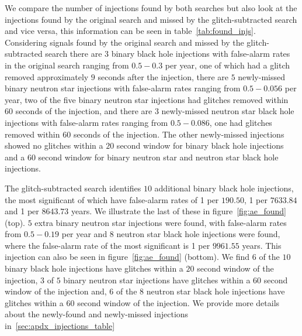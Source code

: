 We compare the number of injections found by both searches but also look at the \gw{} injections found by the original search and missed by the glitch-subtracted search and vice versa, this information can be seen in table~\ref{tab:found_injs}. Considering signals found by the original search and missed by the glitch-subtracted search there are $3$ binary black hole injections with false-alarm rates in the original search ranging from $0.5 - 0.3$ per year, one of which had a glitch removed approximately $9$ seconds after the injection, there are $5$ newly-missed binary neutron star injections with false-alarm rates ranging from $0.5 - 0.056$ per year, two of the five binary neutron star injections had glitches removed within $60$ seconds of the injection, and there are $3$ newly-missed neutron star black hole injections with false-alarm rates ranging from $0.5 - 0.086$, one had glitches removed within $60$ seconds of the injection. The other newly-missed injections showed no \scl{} glitches within a $20$ second window for binary black hole injections and a $60$ second window for binary neutron star and neutron star black hole injections.

The glitch-subtracted search identifies $10$ additional binary black hole injections, the most significant of which have false-alarm rates of 1 per $190.50$, 1 per $7633.84$ and 1 per $8643.73$ years. We illustrate the last of these in figure~\ref{fig:ae_found} (top). $5$ extra binary neutron star injections were found, with false-alarm rates from $0.5 - 0.19$ per year and $8$ neutron star black hole injections were found, where the false-alarm rate of the most significant is 1 per $9961.55$ years. This injection can also be seen in figure~\ref{fig:ae_found} (bottom). We find $6$ of the $10$ binary black hole injections have \scl{} glitches within a $20$ second window of the injection, $3$ of $5$ binary neutron star injections have \scl{} glitches within a $60$ second window of the injection and, $6$ of the $8$ neutron star black hole injections have \scl{} glitches within a $60$ second window of the injection. We provide more details about the newly-found and newly-missed injections in~\ref{sec:apdx_injections_table}

